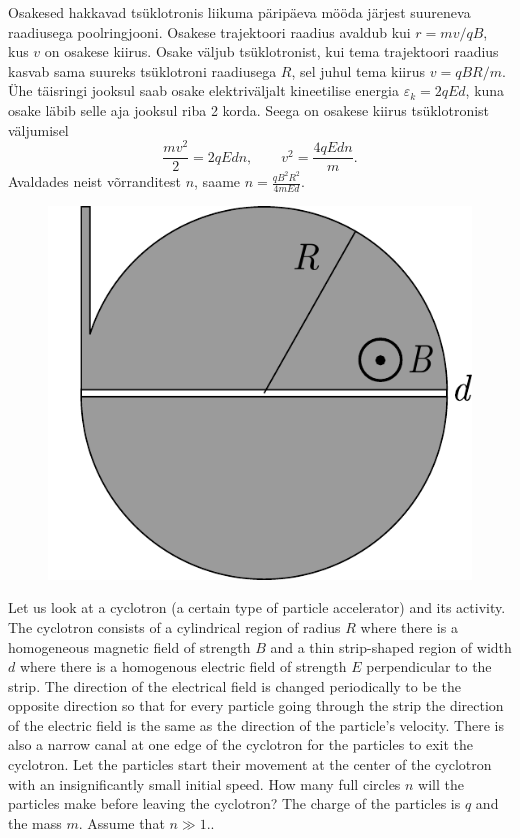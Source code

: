 \solu
Osakesed hakkavad tsüklotronis liikuma päripäeva mööda järjest suureneva raadiusega poolringjooni. Osakese trajektoori raadius avaldub kui $r=mv/qB$, kus $v$ on osakese kiirus. Osake väljub tsüklotronist, kui tema trajektoori raadius kasvab sama suureks tsüklotroni raadiusega $R$, sel juhul tema kiirus $v=qBR/m$. Ühe täisringi jooksul saab osake elektriväljalt kineetilise energia $\varepsilon_k=2qEd$, kuna osake läbib selle aja jooksul riba 2 korda. Seega on osakese kiirus tsüklotronist väljumisel
\[\frac{mv^2}{2}=2qEdn, \qquad v^2=\frac{4qEdn}{m}.\]
Avaldades neist võrranditest $n$, saame $\displaystyle n=\frac{qB^2R^2}{4mEd}$.

\begin{figure}
	\begin{center}
		\includegraphics[width=\linewidth]{2018-v2g-10-tsyklotron}
	\end{center}
\end{figure}
Let us look at a cyclotron (a certain type of particle accelerator) and its activity. The cyclotron consists of a cylindrical region of radius $R$ where there is a homogeneous magnetic field of strength $B$ and a thin strip-shaped region of width $d$ where there is a homogenous electric field of strength $E$ perpendicular to the strip. The direction of the electrical field is changed periodically to be the opposite direction so that for every particle going through the strip the direction of the electric field is the same as the direction of the particle’s velocity. There is also a narrow canal at one edge of the cyclotron for the particles to exit the cyclotron. Let the particles start their movement at the center of the cyclotron with an insignificantly small initial speed. How many full circles $n$ will the particles make before leaving the cyclotron? The charge of the particles is $q$ and the mass $m$. Assume that $n\gg 1.$.

